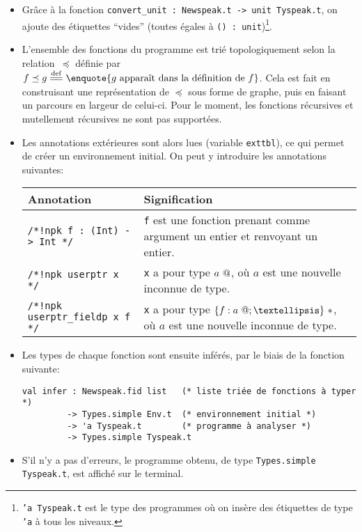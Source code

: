 \begin{itemize}

\item Grâce à la fonction \verb!convert_unit : Newspeak.t -> unit Tyspeak.t!, on
ajoute des étiquettes \enquote{vides} (toutes égales à \verb!() : unit!)\footnote
{\texttt{'a Tyspeak.t} est le type des programmes \newspeak où on insère des
étiquettes de type \texttt{'a} à tous les niveaux.}.

\item L'ensemble des fonctions du programme est trié topologiquement selon la
    relation~$\preceq$ définie par $f \preceq g \eqdef \enquote{g \textrm{
    apparaît dans la définition de } f}$. Cela est fait en construisant une
    représentation de $\preceq$ sous forme de graphe, puis en faisant un
    parcours en largeur de celui-ci. Pour le moment, les fonctions récursives et
    mutellement récursives ne sont pas supportées.

\item Les annotations extérieures sont alors lues (variable \texttt{exttbl}), ce
    qui permet de créer un environnement initial. On peut y introduire les
    annotations suivantes:

  \begin{center}
    \begin{tabular}{lp{7cm}}
        \toprule
        Annotation & Signification \\
        \midrule
        \texttt{/*!npk f : (Int) -> Int */} &
        \texttt{f} est une fonction prenant comme argument un entier et
        renvoyant un entier.
        \\
        \texttt{/*!npk userptr x */} &
        \texttt{x} a pour type $a~@$, où $a$ est une nouvelle inconnue de type.
        \\
        \texttt{/*!npk userptr_fieldp x f */} &
      \texttt{x} a pour type $\{ f: \ptrU{a} ; … \}~*$, où $a$ est une nouvelle inconnue
      de type. \\
      \bottomrule
    \end{tabular}
    \label{page:tab-anns}
  \end{center}

\item Les types de chaque fonction sont ensuite inférés, par le biais de la
    fonction suivante:

\begin{Verbatim}
val infer : Newspeak.fid list   (* liste triée de fonctions à typer *)
         -> Types.simple Env.t  (* environnement initial *)
         -> 'a Tyspeak.t        (* programme à analyser *)
         -> Types.simple Tyspeak.t
\end{Verbatim}

\item S'il n'y a pas d'erreurs, le programme obtenu, de type
\texttt{Types.simple Tyspeak.t}, est affiché sur le terminal.

\end{itemize}


